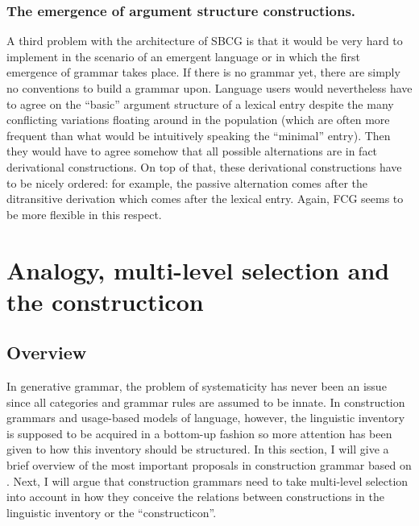 \subsubsection{The emergence of argument structure constructions.}
A third problem with the architecture of SBCG is that it would be very hard to implement in the scenario of an emergent language or in which the first emergence of grammar takes place. If there is no grammar yet, there are simply no conventions to build a grammar upon. Language users would nevertheless have to agree on the ``basic'' argument structure of a lexical entry despite the many conflicting variations floating around in the population (which are often more frequent than what would be intuitively speaking the ``minimal'' entry). Then they would have to agree somehow that all possible alternations are in fact derivational constructions. On top of that, these derivational constructions have to be nicely ordered: for example, the passive alternation comes after the ditransitive derivation which comes after the lexical entry. Again, FCG seems to be more flexible in this respect.

\section{Analogy, multi-level selection and the constructicon}
\label{s:comp-constructicon}

\subsection{Overview}
In generative grammar, the problem of systematicity has never been an issue since all categories and grammar rules are assumed to be innate. In construction grammars and usage-based models of language, however, the linguistic inventory is supposed to be acquired in a bottom-up fashion so more attention has been given to how this inventory should be structured. In this section, I will give a brief overview of the most important proposals in construction grammar based on \citet[262--290]{croft04cognitive}. Next, I will argue that construction grammars need to take multi-level selection into account in how they conceive the relations between constructions in the linguistic inventory or the ``constructicon''.


